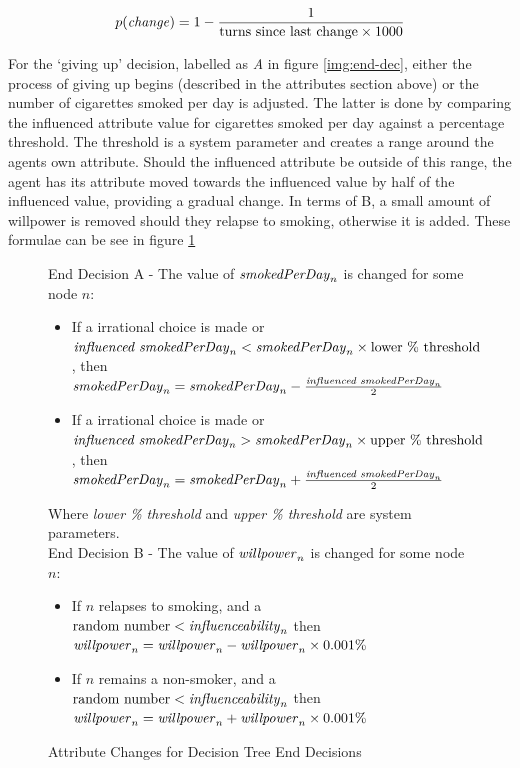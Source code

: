 \documentclass[]{report}
\begin{document}
\begin{equation}
p(\text{\emph{change}}) = 1-\frac{1}{\text{turns since last change}\times 1000}
\label{eq:turns}
\end{equation}

For the `giving up' decision, labelled as \emph{A} in figure \ref{img:end-dec}, either the process of giving up begins (described in the attributes section above) or the number of cigarettes smoked per day is adjusted. The latter is done by comparing the influenced attribute value for cigarettes smoked per day against a percentage threshold. The threshold is a system parameter and creates a range around the agents own attribute. Should the influenced attribute be outside of this range, the agent has its attribute moved towards the influenced value by half of the influenced value, providing a gradual change. In terms of B, a small amount of willpower is removed should they relapse to smoking, otherwise it is added. These formulae can be see in figure \ref{eq:end-attr}
\begin{figure}
End Decision A - The value of $\text{\emph{smokedPerDay}}_{n}$ is changed for some node $n$:
\begin{itemize}
\item If a irrational choice is made or $\text{\emph{influenced smokedPerDay}}_{n} < \text{\emph{smokedPerDay}}_{n}\times\text{lower \% threshold}$, then $\text{\emph{smokedPerDay}}_{n} = \text{\emph{smokedPerDay}}_{n} - \frac{\text{\emph{influenced smokedPerDay}}_{n}}{2}$ 
\item If a irrational choice is made or $\text{\emph{influenced smokedPerDay}}_{n} > \text{\emph{smokedPerDay}}_{n}\times\text{upper \% threshold}$, then $\text{\emph{smokedPerDay}}_{n} = \text{\emph{smokedPerDay}}_{n} + \frac{\text{\emph{influenced smokedPerDay}}_{n}}{2}$
\end{itemize}
Where \emph{lower \% threshold} and \emph{upper \% threshold} are system parameters.\\

End Decision B - The value of $\text{\emph{willpower}}_{n}$ is changed for some node $n$:
\begin{itemize}
\item If $n$ relapses to smoking, and a $\text{random number} < \text{\emph{influenceability}}_{n}$ then $\text{\emph{willpower}}_{n} = \text{\emph{willpower}}_{n} - \text{\emph{willpower}}_{n}\times 0.001\%$
\item If $n$ remains a non-smoker, and a $\text{random number} < \text{\emph{influenceability}}_{n}$ then $\text{\emph{willpower}}_{n} = \text{\emph{willpower}}_{n} + \text{\emph{willpower}}_{n}\times 0.001\%$
\end{itemize}
\caption{Attribute Changes for Decision Tree End Decisions}
\label{eq:end-attr}
\end{figure}
\end{document}
